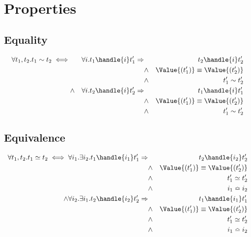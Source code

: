 
\section{Properties}

\statefultrue

\subsection{Equality}

\begin{align*}
\forall t_1, t_2 .  t_1 \sim t_2 \iff &&\forall i . t_1 \handle{i} t_1' \implies& & t_2 \handle{i} t_2'\\
&&&\wedge & \Value{(t_1')} \equiv \Value{(t_2')}\\
&&&\wedge & t_1' \sim t_2'\\
&\wedge& \forall i . t_2 \handle{i} t_2' \implies& & t_1 \handle{i} t_1'\\
&&&\wedge & \Value{(t_1')} \equiv \Value{(t_2')}\\
&&&\wedge & t_1' \sim t_2'
\end{align*}

\subsection{Equivalence}

\begin{align*}
\forall t_1, t_2 .  t_1 \simeq t_2 \iff \forall i_1 .\exists i_2 . t_1 \handle{i_1} t_1'\implies& & t_2 \handle{i_2} t_2'\\
                                                    & \wedge & \Value{(t_1')} \equiv \Value{(t_2')}\\
                                                    & \wedge & t_1' \simeq t_2'\\
                                                    & \wedge & i_1 \bumpeq i_2\\
                                      \wedge\forall i_2.\exists i_1 . t_2 \handle{i_2} t_2'\implies && t_1 \handle{i_1} t_1'\\
                                      & \wedge & \Value{(t_1')} \equiv \Value{(t_2')}\\
                                      & \wedge & t_1' \simeq t_2'\\
                                      & \wedge & i_1 \bumpeq i_2\\
\end{align*}
